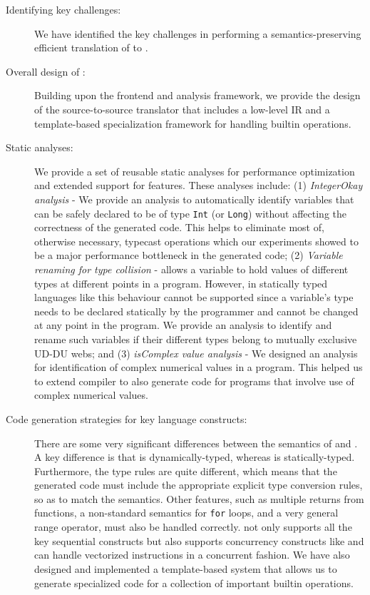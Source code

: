 \begin{description}

\item[Identifying key challenges:] We have identified the key challenges
in performing a semantics-preserving efficient translation of \matlab to \xten.

\item[Overall design of \mixten:] Building upon the \mclab frontend and analysis
framework, we provide the design of the \mixten
source-to-source translator that includes a low-level \xten IR and a
template-based specialization framework for handling builtin operations.

\item[Static analyses:] We provide a set of reusable static analyses for
performance optimization and extended support for \matlab features. These
analyses include: (1) \emph{IntegerOkay analysis} - We provide an analysis to
automatically identify
variables that can be safely declared to be of type \texttt{Int} (or
\texttt{Long}) without
affecting the correctness of the generated \xten code. This helps to eliminate
most of, otherwise necessary, typecast operations which our experiments
showed to be a major performance bottleneck in the generated code; (2)
\emph{Variable renaming for type collision} - \matlab allows a variable to 
hold values of different
types at different points in a program. However, in statically typed
languages like \xten this behaviour cannot be supported since a 
variable's type needs to be declared statically by the programmer and cannot be 
changed at any
point in the program. We provide an analysis to identify and rename such
variables if their different types belong to mutually exclusive UD-DU webs; and (3)
\emph{isComplex value analysis} - We designed an analysis for identification of
complex numerical values in a \matlab program. This helped us to extend \mixten
compiler to also generate \xten code for \matlab programs that involve use of
complex numerical values.

\item[Code generation strategies for key language constructs:]  There
are some very significant differences between the semantics of \matlab
and \xten.  A key difference is that \matlab is dynamically-typed,
whereas \xten is statically-typed.   Furthermore, the type rules are
quite different, which means that the generated \xten code must include
the appropriate explicit type conversion rules, so as to match the
\matlab semantics.   Other \matlab features, such as multiple returns
from functions, a non-standard semantics for \texttt{for} loops, and a
very general range operator, must also be handled correctly.
\mixten not only supports all the key sequential constructs but also supports
concurrency constructs like \parfor and can handle vectorized instructions in a
concurrent fashion.
We have also designed and implemented a template-based system that allows us to
generate specialized \xten code for a collection of important \matlab builtin
operations.
  

\end{description}
